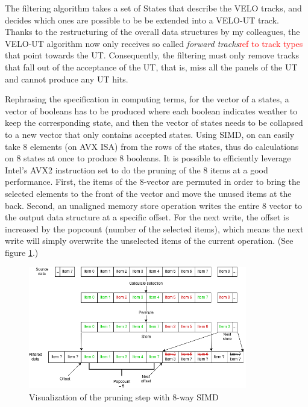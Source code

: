 \documentclass[12pt]{article}
\begin{document}
The filtering algorithm takes a set of States that describe the VELO tracks, and decides which ones are possible to be be extended into a VELO-UT track. Thanks to the restructuring of the overall data structures by my colleagues, the VELO-UT algorithm now only receives so called \textit{forward tracks}\textcolor{red}{ref to track types} that point towards the UT. Consequently, the filtering must only remove tracks that fall out of the acceptance of the UT, that is, miss all the panels of the UT and cannot produce any UT hits.

Rephrasing the specification in computing terms, for the vector of a states, a vector of booleans has to be produced where each boolean indicates weather to keep the corresponding state, and then the vector of states needs to be collapsed to a new vector that only contains accepted states. Using SIMD, on can easily take 8 elements (on AVX ISA) from the rows of the states, thus do calculations on 8 states at once to produce 8 booleans. It is possible to efficiently leverage Intel's AVX2 instruction set to do the pruning of the 8 items at a good performance\cite{lemire_simd_prune}. First, the items of the 8-vector are permuted in order to bring the selected elements to the front of the vector and move the unused items at the back. Second, an unaligned memory store operation writes the entire 8 vector to the output data structure at a specific offset. For the next write, the offset is increased by the popcount (number of the selected items), which means the next write will simply overwrite the unselected items of the current operation. (See figure \ref{fig_velout_opt_simd_filter}.)

\begin{figure}[H]
	\begin{center}
		\includegraphics[width=0.85\textwidth]{velout_opt_simd_filter}
	\end{center}
	\caption{Visualization of the pruning step with 8-way SIMD}
	\label{fig_velout_opt_simd_filter}
\end{figure}
\end{document}
